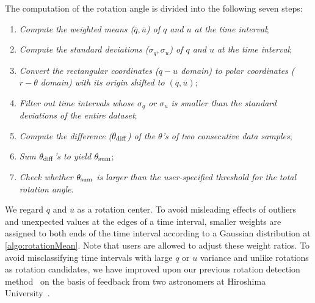 The computation of the rotation angle is divided into the following seven steps:
\begin{enumerate}[nosep, label=\textsl{Step \arabic*}:, ref=\textsl{Step \arabic*}, align=parleft, leftmargin=*]
    \item \textsl{Compute the weighted means ($\overline{q}, \overline{u}$) of $q$ and $u$ at the time interval};\label{algo:rotationMean}
    \item \textsl{Compute the standard deviations ($\sigma_{q}, \sigma_{u}$) of $q$ and $u$ at the time interval}; \label{algo:rotationStd}
    \item \textsl{Convert the rectangular coordinates ($q-u$ domain) to polar coordinates ($r - \theta$ domain) with its origin shifted to $(\overline{q}, \overline{u})$}; \label{algo:rotationPolar}
    \item \textsl{Filter out time intervals whose $\sigma_{q}$ or $\sigma_{u}$ is smaller than the standard deviations of the entire dataset}; \label{algo:rotationFilter}
    \item \textsl{Compute the difference ($\theta_{\rm diff}$) of the $\theta$'s of two consecutive data samples}; \label{algo:rotationDiff}
    \item \textsl{Sum $\theta_{\rm diff}$'s to yield $\theta_{\rm sum}$}; \label{algo:rotationSum}
    \item \textsl{Check whether $\theta_{\rm sum}$ is larger than the user-specified threshold for the total rotation angle}. \label{algo:rotationThreshold}
\end{enumerate}
We regard $\overline{q}$ and $\overline{u}$ as a rotation center. 
To avoid misleading effects of outliers and unexpected values at the edges of a time interval,
smaller weights are assigned to both ends of the time interval according to a Gaussian distribution at \ref{algo:rotationMean}.
Note that users are allowed to adjust these weight ratios.
%
To avoid misclassifying time intervals with large $q$ or $u$ variance and unlike rotations as rotation candidates,
we have improved upon our previous rotation detection method~\cite{Sawada2018} on the basis of feedback from two astronomers at Hiroshima University~\cite{Huang2019}.
%
